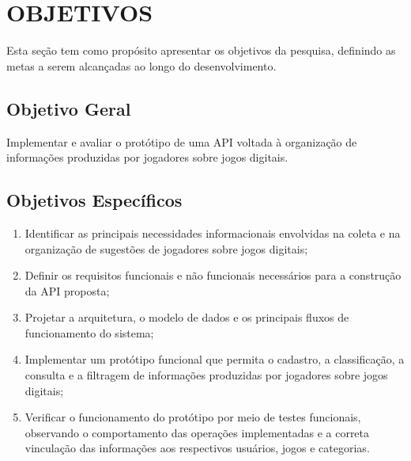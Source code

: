 \chapter{OBJETIVOS}
Esta seção tem como propósito apresentar os objetivos da pesquisa, definindo as metas a serem alcançadas ao longo do desenvolvimento.

\section{Objetivo Geral}

Implementar e avaliar o protótipo de uma API voltada à organização de informações produzidas por jogadores sobre jogos digitais.

\section{Objetivos Específicos}

\begin{enumerate}
    \item Identificar as principais necessidades informacionais envolvidas na coleta e na organização de sugestões de jogadores sobre jogos digitais;
    
    \item Definir os requisitos funcionais e não funcionais necessários para a construção da API proposta;
    
    \item Projetar a arquitetura, o modelo de dados e os principais fluxos de funcionamento do sistema;
    
    \item Implementar um protótipo funcional que permita o cadastro, a classificação, a consulta e a filtragem de informações produzidas por jogadores sobre jogos digitais;
    
    \item Verificar o funcionamento do protótipo por meio de testes funcionais, observando o comportamento das operações implementadas e a correta vinculação das informações aos respectivos usuários, jogos e categorias.
\end{enumerate}